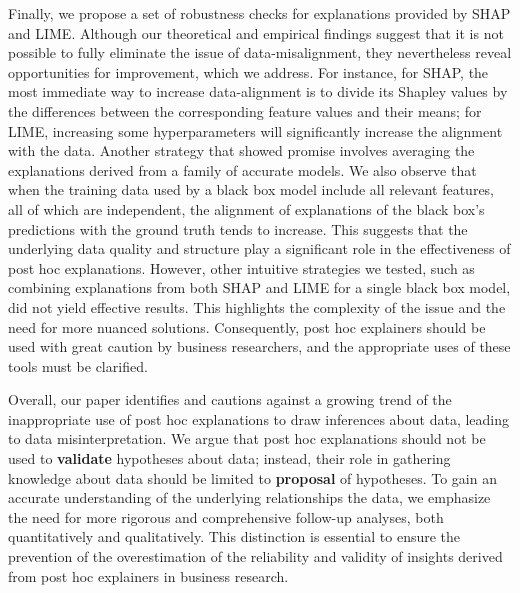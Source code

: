 \documentclass[mnsc,blindrev]{informs3}
\begin{document}


Finally, we propose a set of robustness checks for explanations provided by SHAP and LIME. Although our theoretical and empirical findings suggest that it is not possible to fully eliminate the issue of data-misalignment, they nevertheless reveal opportunities for improvement, which we address. For instance, for SHAP, the most immediate way to increase data-alignment is to divide its Shapley values by the differences between the corresponding feature values and their means; for LIME, increasing some hyperparameters will significantly increase the alignment with the data.
Another strategy that showed promise involves averaging the explanations derived from a family of accurate models. We also observe that when the training data used by a black box model include all relevant features, all of which are independent, the alignment of explanations of the black box's predictions with the ground truth tends to increase. This suggests that the underlying data quality and structure play a significant role in the effectiveness of post hoc explanations.
However, other intuitive strategies we tested, such as combining explanations from both SHAP and LIME for a single black box model, did not yield effective results. This highlights the complexity of the issue and the need for more nuanced solutions. Consequently, post hoc explainers should be used with great caution by business researchers, and the appropriate uses of these tools must be clarified.


Overall, our paper identifies and cautions against a growing trend of the inappropriate use of post hoc explanations to draw inferences about data, leading to data misinterpretation. We argue that post hoc explanations should not be used to \textbf{validate} hypotheses about data; instead, their role in gathering knowledge about data should be limited to \textbf{proposal} of hypotheses. To gain an accurate understanding of the underlying relationships  the data, we emphasize the need for more rigorous and comprehensive follow-up analyses, both quantitatively and qualitatively. This distinction is essential to ensure the prevention of the overestimation of the reliability and validity of insights derived from post hoc explainers in business research.
\end{document}
